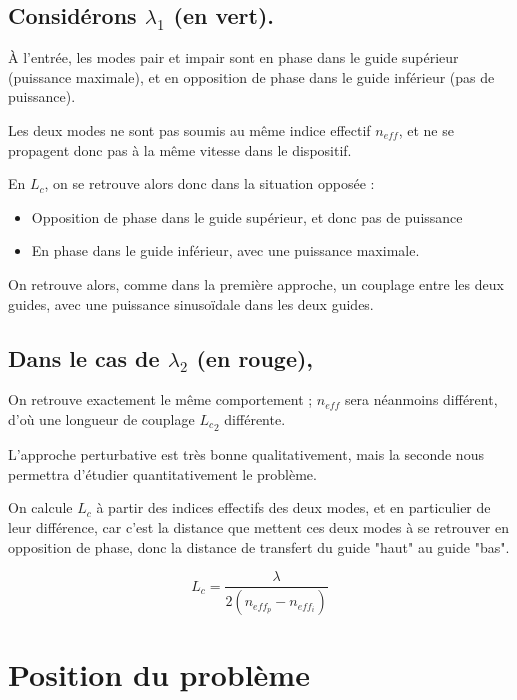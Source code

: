 \documentclass[a4paper,11pt]{report}
\begin{document}
\subsection*{Considérons $\lambda_1$ (en vert).}
À l'entrée, les modes pair et impair sont en phase dans le guide supérieur (puissance maximale), et en opposition de phase dans le guide inférieur (pas de puissance).

Les deux modes ne sont pas soumis au même indice effectif $n_{eff}$, et ne se propagent donc pas à la même vitesse dans le dispositif.

En $L_c$, on se retrouve alors donc dans la situation opposée :
\begin{itemize}
    \item Opposition de phase dans le guide supérieur, et donc pas de puissance
    \item En phase dans le guide inférieur, avec une puissance maximale.
    \newline
\end{itemize}

On retrouve alors, comme dans la première approche, un couplage entre les deux guides, avec une puissance sinusoïdale dans les deux guides.


\subsection*{Dans le cas de $\lambda_2$ (en rouge),}
On retrouve exactement le même comportement ; $n_{eff}$ sera néanmoins différent, d'où une longueur de couplage ${L_c}_2$ différente.
\newline

L'approche perturbative est très bonne qualitativement, mais la seconde nous permettra d'étudier quantitativement le problème.

On calcule $L_c$ à partir des indices effectifs des deux modes, et en particulier de leur différence, car c'est la distance que mettent ces deux modes à se retrouver en opposition de phase, donc la distance de transfert du guide "haut" au guide "bas".

\begin{equation}
    L_c=\dfrac{\lambda}{2(n_{eff_p}-n_{eff_i})}
\end{equation}

\section{Position du problème}
\end{document}
